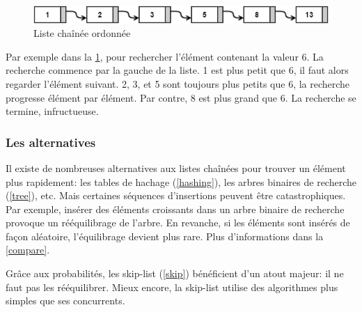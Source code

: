 \documentclass[hidelinks,a4paper, 12pt]{article}
\begin{document}
	\begin{figure}[h]
		\includegraphics[width=\textwidth]{img/linkedList}
		\caption{Liste chaînée ordonnée}
		\label{LinkedList}
	\end{figure}
	
	Par exemple dans la \cref{LinkedList}, pour rechercher l'élément contenant la valeur 6. La recherche commence par la gauche de la liste. 1 est plus petit que 6, il faut alors regarder l'élément suivant. 2, 3, et 5 sont toujours plus petits que 6, la recherche progresse élément par élément. Par contre, 8 est plus grand que 6. La recherche se termine, infructueuse.
	
	\subsubsection*{Les alternatives}
	Il existe de nombreuses alternatives aux listes chaînées pour trouver un élément plus rapidement: les tables de hachage (\cref{hashing}), les arbres binaires de recherche (\cref{tree}), etc. Mais certaines séquences d'insertions peuvent être catastrophiques. Par exemple, insérer des éléments croissants dans un arbre binaire de recherche provoque un rééquilibrage de l'arbre. En revanche, si les éléments sont insérés de façon aléatoire, l'équilibrage devient plus rare. Plus d'informations dans la \cref{compare}.

	Grâce aux probabilités, les \og skip-list \fg{} (\cref{skip}) bénéficient d'un atout majeur: il ne faut pas les rééquilibrer. Mieux encore, la skip-list utilise des algorithmes plus simples que ses concurrents.
	
\end{document}
